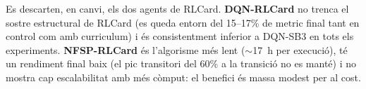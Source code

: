 Es descarten, en canvi, els dos agents de RLCard. \textbf{DQN-RLCard} no trenca el sostre
estructural de RLCard (es queda entorn del 15--17\% de \(\text{metric}\) final tant en
control com amb curriculum) i és consistentment inferior a DQN-SB3 en tots els experiments.
\textbf{NFSP-RLCard} és l'algorisme més lent ($\sim$17~h per execució), té un rendiment final
baix (el pic transitori del 60\% a la transició no es manté) i no mostra cap escalabilitat
amb més còmput: el benefici és massa modest per al cost.
